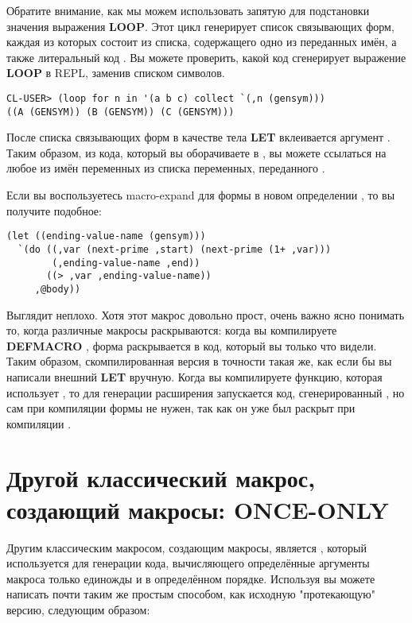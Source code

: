 Обратите внимание, как мы можем использовать запятую для подстановки значения выражения
\textbf{LOOP}. Этот цикл генерирует список связывающих форм, каждая из которых состоит из
списка, содержащего одно из переданных  имён, а также литеральный код
. Вы можете проверить, какой код сгенерирует выражение \textbf{LOOP} в
REPL, заменив  списком символов.

\begin{lstlisting}
CL-USER> (loop for n in '(a b c) collect `(,n (gensym)))
((A (GENSYM)) (B (GENSYM)) (C (GENSYM)))
\end{lstlisting}

После списка связывающих форм в качестве тела \textbf{LET} вклеивается аргумент
 . Таким образом, из кода, который вы оборачиваете в
, вы можете ссылаться на любое из имён переменных из списка переменных,
переданного .

Если вы воспользуетесь macro-expand для формы  в новом определении
, то вы получите подобное:

\begin{lstlisting}
(let ((ending-value-name (gensym)))
  `(do ((,var (next-prime ,start) (next-prime (1+ ,var)))
        (,ending-value-name ,end))
       ((> ,var ,ending-value-name))
     ,@body))
\end{lstlisting}

Выглядит неплохо. Хотя этот макрос довольно прост, очень важно ясно понимать то, когда
различные макросы раскрываются: когда вы компилируете \textbf{DEFMACRO} ,
форма  раскрывается в код, который вы только что видели. Таким образом,
скомпилированная версия  в точности такая же, как если бы вы написали
внешний \textbf{LET} вручную. Когда вы компилируете функцию, которая использует
, то для генерации расширения  запускается код,
сгенерированный , но сам  при компиляции формы
 не нужен, так как он уже был раскрыт при компиляции .


\section{Другой классический макрос, создающий макросы: ONCE-ONLY}

Другим классическим макросом, создающим макросы, является , который
используется для генерации кода, вычисляющего определённые аргументы макроса только
единожды и в определённом порядке. Используя  вы можете написать
 почти таким же простым способом, как исходную "протекающую" версию,
следующим образом:

